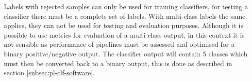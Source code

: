         
        Labels with rejected samples can only be used for training classifiers, for testing a classifier there must be a complete set of labels. With multi-class labels the same applies, they can not be used for testing and evaluation purposes. Although it is possible to use metrics for evaluation of a multi-class output, in this context it is not sensible as performance of pipelines must be assessed and optimised for a binary positive/negative output. The classifier output will contain 5 classes which must then be converted back to a binary output, this is done as described in section \ref{subsec:pl-clf-software}.